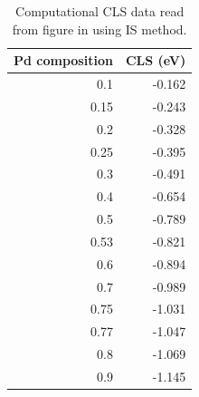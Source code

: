 \documentclass[number, sort&compress, review, 12pt]{elsarticle}
\begin{document}
\begin{table}[H]
\caption{\label{is-method}Computational CLS data read from figure in \cite{olovsson-2002-core-level} using IS method.}
\centering
\begin{tabular}{rr}
Pd composition & CLS (eV)\\
\hline
0.1 & -0.162\\
0.15 & -0.243\\
0.2 & -0.328\\
0.25 & -0.395\\
0.3 & -0.491\\
0.4 & -0.654\\
0.5 & -0.789\\
0.53 & -0.821\\
0.6 & -0.894\\
0.7 & -0.989\\
0.75 & -1.031\\
0.77 & -1.047\\
0.8 & -1.069\\
0.9 & -1.145\\
\end{tabular}
\end{table}



\end{document}
